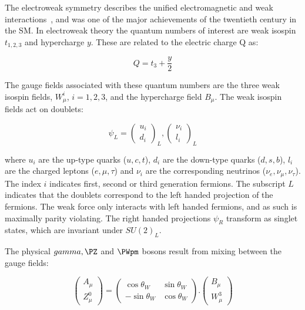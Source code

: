 The electroweak symmetry describes the unified electromagnetic and weak
interactions~\cite{GlashowPartialSymmetries,WeinbergModelOfLeptons,SalamNobelSymposium}, 
and was one of the major achievements of the twentieth
century in the \ac{SM}. In electroweak theory the quantum numbers of interest are
weak isospin $t_{1,2,3}$ and hypercharge $y$. These are related to the
electric charge Q as: 

\begin{equation}
Q = t_{3} + \frac{y}{2}
\end{equation}

The gauge fields associated with these quantum numbers are the three weak isospin fields,
$W_{\mu}^{i}$, $i = 1,2,3$, and the hypercharge field $B_{\mu}$. The weak
isospin fields act on doublets: 

\begin{equation}
\psi_{L} =  \begin{pmatrix} u_{i} \\ d_{i} \end{pmatrix}_{L} ,   
\begin{pmatrix} \nu_{i} \\ {l_{i}} \end{pmatrix}_{L}
\end{equation}

where $u_{i}$ are the up-type quarks ($u,c,t$), $d_{i}$ are the down-type quarks
($d,s,b$), $l_{i}$ are the charged leptons ($e,\mu,\tau$) and $\nu_{i}$ are the
corresponding neutrinos ($\nu_{e},\nu_{\mu},\nu_{\tau}$). The index $i$ indicates first, second or third
generation fermions. The subscript $L$ indicates that the doublets correspond to
the left handed projection of the fermions. The weak force only interacts with
left handed fermions, and as such is maximally parity violating. The right
handed projections $\psi_{R}$
transform as singlet states, which are invariant under $SU(2)_{L}$.

The physical $\gamma, \PZ$ and $\PWpm$ bosons result from mixing between the gauge
fields:

\begin{equation}
\begin{pmatrix} A_{\mu} \\ Z_{\mu}^{0} \end{pmatrix} = 
\begin{pmatrix} \cos{\theta_{W}} & \sin{\theta_{W}} \\ -\sin{\theta_{W}} &
\cos{\theta_{W}} \end{pmatrix} . 
\begin{pmatrix} B_{\mu} \\ W_{\mu}^{3} \end{pmatrix}
\end{equation}

